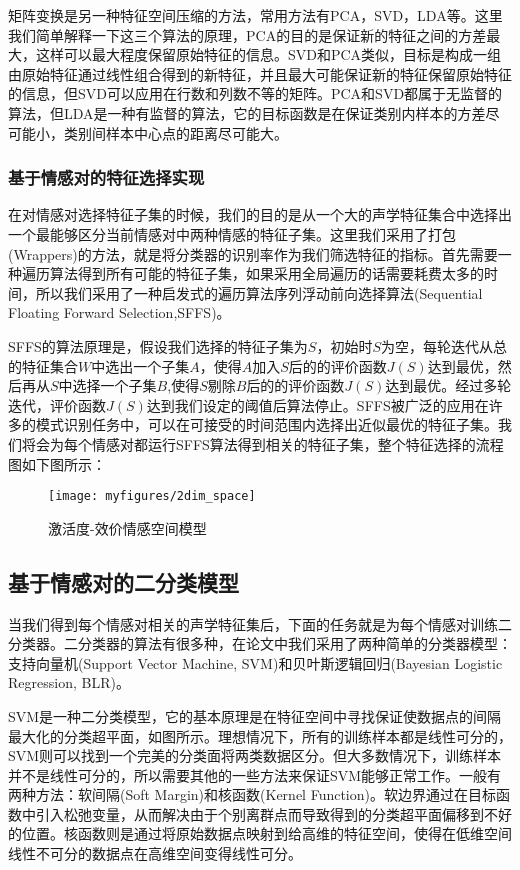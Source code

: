 矩阵变换是另一种特征空间压缩的方法，常用方法有PCA，SVD，LDA等。这里我们简单解释一下这三个算法的原理，PCA的目的是保证新的特征之间的方差最大，这样可以最大程度保留原始特征的信息。SVD和PCA类似，目标是构成一组由原始特征通过线性组合得到的新特征，并且最大可能保证新的特征保留原始特征的信息，但SVD可以应用在行数和列数不等的矩阵。PCA和SVD都属于无监督的算法，但LDA是一种有监督的算法，它的目标函数是在保证类别内样本的方差尽可能小，类别间样本中心点的距离尽可能大。
 
\subsubsection{基于情感对的特征选择实现}
\label{sssec:emo_pair_feature_select_implement}
在对情感对选择特征子集的时候，我们的目的是从一个大的声学特征集合中选择出一个最能够区分当前情感对中两种情感的特征子集。这里我们采用了打包(Wrappers)的方法，就是将分类器的识别率作为我们筛选特征的指标。首先需要一种遍历算法得到所有可能的特征子集，如果采用全局遍历的话需要耗费太多的时间，所以我们采用了一种启发式的遍历算法序列浮动前向选择算法(Sequential Floating Forward Selection,SFFS)。

SFFS的算法原理是，假设我们选择的特征子集为$S$，初始时$S$为空，每轮迭代从总的特征集合$W$中选出一个子集$A$，使得$A$加入$S$后的的评价函数$J(S)$达到最优，然后再从$S$中选择一个子集$B$,使得$S$剔除$B$后的的评价函数$J(S)$达到最优。经过多轮迭代，评价函数$J(S)$达到我们设定的阈值后算法停止。SFFS被广泛的应用在许多的模式识别任务中，可以在可接受的时间范围内选择出近似最优的特征子集。我们将会为每个情感对都运行SFFS算法得到相关的特征子集，整个特征选择的流程图如下图所示：

\begin{figure}[H] %
    \centering
    \texttt{[image: myfigures/2dim\_space]}
    \caption{激活度-效价情感空间模型}
    \label{fig:xfig1}
\end{figure}

\subsection{基于情感对的二分类模型}
\label{ssec:emo_pair_bi_cls}

当我们得到每个情感对相关的声学特征集后，下面的任务就是为每个情感对训练二分类器。二分类器的算法有很多种，在论文中我们采用了两种简单的分类器模型：支持向量机(Support Vector Machine, SVM)和贝叶斯逻辑回归(Bayesian Logistic Regression, BLR)。

SVM是一种二分类模型，它的基本原理是在特征空间中寻找保证使数据点的间隔最大化的分类超平面，如图所示。理想情况下，所有的训练样本都是线性可分的，SVM则可以找到一个完美的分类面将两类数据区分。但大多数情况下，训练样本并不是线性可分的，所以需要其他的一些方法来保证SVM能够正常工作。一般有两种方法：软间隔(Soft Margin)和核函数(Kernel Function)。软边界通过在目标函数中引入松弛变量，从而解决由于个别离群点而导致得到的分类超平面偏移到不好的位置。核函数则是通过将原始数据点映射到给高维的特征空间，使得在低维空间线性不可分的数据点在高维空间变得线性可分。

